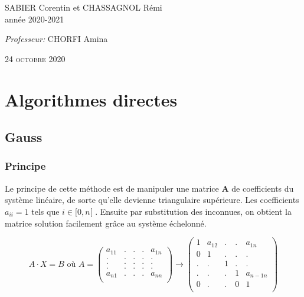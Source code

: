 \documentclass[a4paper]{article}
\begin{document}
\begin{titlepage}
\begin{center}
    \begin{minipage}{0.9\textwidth}
      \begin{flushleft} \large
        SABIER Corentin et CHASSAGNOL Rémi\\
        année 2020-2021\\[2cm]
      \end{flushleft}
    \end{minipage}

    \begin{minipage}{0.9\textwidth}
      \begin{flushright} \large
        \emph{Professeur:} CHORFI Amina\\
      \end{flushright}
    \end{minipage}

    \textsc{24 octobre 2020}

  \end{center}
\end{titlepage}

\clearpage

\tableofcontents

\clearpage

\section{Algorithmes directes}

\subsection{Gauss}

\subsubsection{Principe}

Le principe de cette méthode est de manipuler une matrice \textbf{A} de coefficients du système linéaire, de sorte qu'elle devienne triangulaire supérieure. Les coefficients $a_{ii} = 1$ tels que $i \in [0,n[$ . Ensuite par substitution des inconnues, on obtient la matrice solution facilement grâce au système échelonné.

\[
A \cdot X = B \text{  où  } A = \begin{pmatrix} 
a_{11} & .  & . & . & a_{1n}\\ 
.      & .  & . & . & . \\ 
.      & .  & . & . & . \\ 
.      & .  & . & . & . \\
a_{n1} & .  & . & . & a_{nn} \\  
\end{pmatrix}
\longrightarrow
\begin{pmatrix} 
1      & a_{12}  & . & . & a_{1n}\\ 
0      & 1  	 & . & . & . \\ 
.      & .  	 & 1 & . & . \\ 
.      & .   	 & . & 1 & a_{n-1n} \\
0      & .  	 & . & 0 & 1 \\  
\end{pmatrix}
\]
\end{document}
